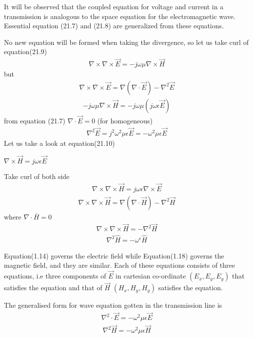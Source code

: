 It will be observed that the coupled equation for voltage and current in a transmission is analogous to the space equation for the electromagnetic wave. Essential equation (21.7) and (21.8) are generalized from these equations.

No new equation will be formed when taking the divergence, so let us take curl of equation(21.9)
\begin{align}
\nabla\times\nabla\times\vec{E}=-j\omega\mu\nabla\times\vec{H}
\end{align}
but 
\begin{align}
\nabla\times\nabla\times\vec{E}=\nabla(\nabla\cdot\vec{E}) - \nabla^2\vec{E}
\end{align}
\begin{align}
-j\omega\mu\nabla\times \vec{H}=-j\omega\mu(j\omega\epsilon\vec{E})
\end{align}
from equation (21.7) $\nabla\cdot\vec{E}=0$ (for homogeneous)
\begin{align}
\nabla^2\vec{E}=j^2\omega^2\mu\epsilon\vec{E}=-\omega^2\mu\epsilon\vec{E}
\end{align}
Let us take a look at equation(21.10)

$\nabla\times\vec{H}=j\omega\epsilon\vec{E}$

Take curl of both side
\begin{align}
\nabla\times\nabla\times\vec{H}=j\omega\epsilon\nabla\times\vec{E}
\end{align}
\begin{align}
\nabla\times\nabla\times\vec{H}=\nabla(\nabla\cdot\vec{H})-\nabla^2\vec{H}
\end{align}
where $\nabla\cdot\bar{H}=0$
\begin{align}
\nabla\times\nabla\times\vec{H}=-\nabla^2\vec{H}
\end{align}
\begin{align}
\nabla^2 \hat{H}=-\omega^\epsilon \hat{H}
\end{align}

Equation(1.14) governs the electric field while  Equation(1.18) governs the magnetic field, and they are similar. Each of these equations consists of three equations, i.e three components of $\vec{E}$ in cartesian co-ordinate $(E_{x}, E_{y}, E_{y})$ that satisfies the equation and that of  $\vec{H}$ $(H_{x},H_{y},H_{y})$ satisfies the equation.

The generalised form for wave equation gotten in the transmission line is
\begin{align}
\nabla^2\cdot\vec{E}=-\omega^2\mu\epsilon\vec{E}
\end{align}
\begin{align}
\nabla^2\vec{H}=-\omega^2\mu\epsilon\vec{H}
\end{align}

